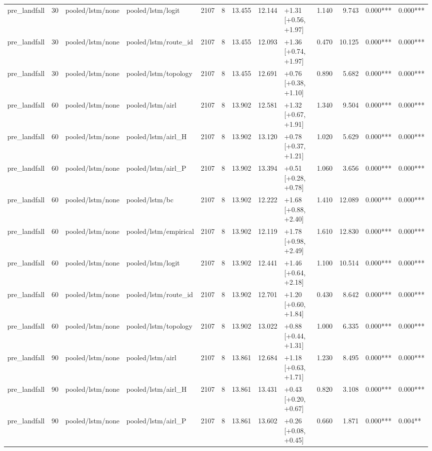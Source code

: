 \begin{tabular}{lrllrrrrlrrll}
pre_landfall & 30 & pooled/lstm/none & pooled/lstm/logit & 2107 & 8 & 13.455 & 12.144 & +1.31 [+0.56, +1.97] & 1.140 & 9.743 & 0.000*** & 0.000*** \\
pre_landfall & 30 & pooled/lstm/none & pooled/lstm/route_id & 2107 & 8 & 13.455 & 12.093 & +1.36 [+0.74, +1.97] & 0.470 & 10.125 & 0.000*** & 0.000*** \\
pre_landfall & 30 & pooled/lstm/none & pooled/lstm/topology & 2107 & 8 & 13.455 & 12.691 & +0.76 [+0.38, +1.10] & 0.890 & 5.682 & 0.000*** & 0.000*** \\
pre_landfall & 60 & pooled/lstm/none & pooled/lstm/airl & 2107 & 8 & 13.902 & 12.581 & +1.32 [+0.67, +1.91] & 1.340 & 9.504 & 0.000*** & 0.000*** \\
pre_landfall & 60 & pooled/lstm/none & pooled/lstm/airl_H & 2107 & 8 & 13.902 & 13.120 & +0.78 [+0.37, +1.21] & 1.020 & 5.629 & 0.000*** & 0.000*** \\
pre_landfall & 60 & pooled/lstm/none & pooled/lstm/airl_P & 2107 & 8 & 13.902 & 13.394 & +0.51 [+0.28, +0.78] & 1.060 & 3.656 & 0.000*** & 0.000*** \\
pre_landfall & 60 & pooled/lstm/none & pooled/lstm/bc & 2107 & 8 & 13.902 & 12.222 & +1.68 [+0.88, +2.40] & 1.410 & 12.089 & 0.000*** & 0.000*** \\
pre_landfall & 60 & pooled/lstm/none & pooled/lstm/empirical & 2107 & 8 & 13.902 & 12.119 & +1.78 [+0.98, +2.49] & 1.610 & 12.830 & 0.000*** & 0.000*** \\
pre_landfall & 60 & pooled/lstm/none & pooled/lstm/logit & 2107 & 8 & 13.902 & 12.441 & +1.46 [+0.64, +2.18] & 1.100 & 10.514 & 0.000*** & 0.000*** \\
pre_landfall & 60 & pooled/lstm/none & pooled/lstm/route_id & 2107 & 8 & 13.902 & 12.701 & +1.20 [+0.60, +1.84] & 0.430 & 8.642 & 0.000*** & 0.000*** \\
pre_landfall & 60 & pooled/lstm/none & pooled/lstm/topology & 2107 & 8 & 13.902 & 13.022 & +0.88 [+0.44, +1.31] & 1.000 & 6.335 & 0.000*** & 0.000*** \\
pre_landfall & 90 & pooled/lstm/none & pooled/lstm/airl & 2107 & 8 & 13.861 & 12.684 & +1.18 [+0.63, +1.71] & 1.230 & 8.495 & 0.000*** & 0.000*** \\
pre_landfall & 90 & pooled/lstm/none & pooled/lstm/airl_H & 2107 & 8 & 13.861 & 13.431 & +0.43 [+0.20, +0.67] & 0.820 & 3.108 & 0.000*** & 0.000*** \\
pre_landfall & 90 & pooled/lstm/none & pooled/lstm/airl_P & 2107 & 8 & 13.861 & 13.602 & +0.26 [+0.08, +0.45] & 0.660 & 1.871 & 0.000*** & 0.004** \\

\end{tabular}
